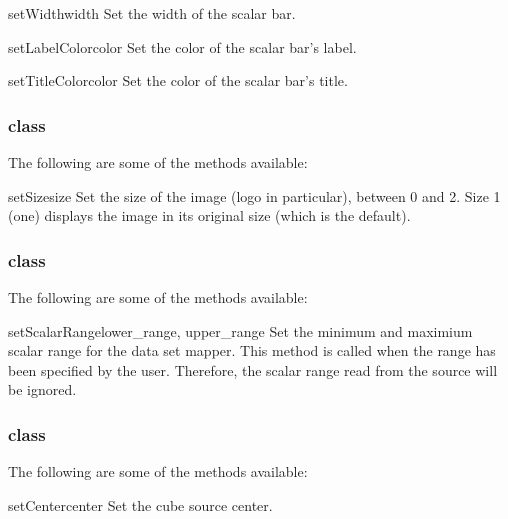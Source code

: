 \begin{methoddesc}[ScalarBar]{setWidth}{width}
Set the width of the scalar bar.
\end{methoddesc}

\begin{methoddesc}[ScalarBar]{setLabelColor}{color}
Set the color of the scalar bar's label.
\end{methoddesc}

\begin{methoddesc}[ScalarBar]{setTitleColor}{color}
Set the color of the scalar bar's title.
\end{methoddesc}

\subsubsection{\ImageReslice class}

The following are some of the methods available:

\begin{methoddesc}[ImageReslice]{setSize}{size}
Set the size of the image (logo in particular), between 0 and 2. Size 1 (one) 
displays the image in its original size (which is the default).
\end{methoddesc}

\subsubsection{\DataSetMapper class}

The following are some of the methods available:

\begin{methoddesc}[DataSetMapper]{setScalarRange}{lower_range, upper_range}
Set the minimum and maximium scalar range for the data set mapper. This
method is called when the range has been specified by the user.
Therefore, the scalar range read from the source will be ignored.
\end{methoddesc}

\subsubsection{\CubeSource class}

The following are some of the methods available:

\begin{methoddesc}[CubeSource]{setCenter}{center}
Set the cube source center.
\end{methoddesc}

